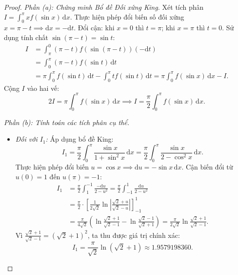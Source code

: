 \documentclass{article}
\begin{document}
\begin{proof}
\emph{Phần (a): Chứng minh Bổ đề Đối xứng King.}
Xét tích phân $I = \int_0^\pi x f(\sin x)\,\mathrm{d}x$. Thực hiện phép đổi biến số đối xứng $x = \pi - t \implies \mathrm{d}x = -\mathrm{d}t$.
Đổi cận: khi $x = 0$ thì $t = \pi$; khi $x = \pi$ thì $t = 0$. Sử dụng tính chất $\sin(\pi - t) = \sin t$:
\begin{align}
    I &= \int_\pi^0 (\pi - t) f(\sin(\pi - t)) (-\mathrm{d}t) \nonumber \\
    &= \int_0^\pi (\pi - t) f(\sin t)\,\mathrm{d}t \nonumber \\
    &= \pi \int_0^\pi f(\sin t)\,\mathrm{d}t - \int_0^\pi t f(\sin t)\,\mathrm{d}t = \pi \int_0^\pi f(\sin x)\,\mathrm{d}x - I.
\end{align}
Cộng $I$ vào hai vế:
\begin{equation}
    2I = \pi \int_0^\pi f(\sin x)\,\mathrm{d}x \implies I = \frac{\pi}{2} \int_0^\pi f(\sin x)\,\mathrm{d}x.
\end{equation}

\emph{Phần (b): Tính toán các tích phân cụ thể.}
\begin{itemize}
    \item \emph{Đối với $I_1$:} Áp dụng bổ đề King:
    \begin{equation}
        I_1 = \frac{\pi}{2} \int_0^\pi \frac{\sin x}{1 + \sin^2 x}\,\mathrm{d}x = \frac{\pi}{2} \int_0^\pi \frac{\sin x}{2 - \cos^2 x}\,\mathrm{d}x.
    \end{equation}
    Thực hiện phép đổi biến $u = \cos x \implies \mathrm{d}u = -\sin x\,\mathrm{d}x$. Cận biến đổi từ $u(0) = 1$ đến $u(\pi) = -1$:
    \begin{align}
        I_1 &= \frac{\pi}{2} \int_1^{-1} \frac{-\mathrm{d}u}{2 - u^2} = \frac{\pi}{2} \int_{-1}^1 \frac{\mathrm{d}u}{2 - u^2} \nonumber \\
        &= \frac{\pi}{2} \cdot \left[ \frac{1}{2\sqrt{2}} \ln\left|\frac{\sqrt{2} + u}{\sqrt{2} - u}\right| \right]_{-1}^1 \nonumber \\
        &= \frac{\pi}{4\sqrt{2}} \left( \ln\frac{\sqrt{2} + 1}{\sqrt{2} - 1} - \ln\frac{\sqrt{2} - 1}{\sqrt{2} + 1} \right) = \frac{\pi}{2\sqrt{2}} \ln\frac{\sqrt{2} + 1}{\sqrt{2} - 1}.
    \end{align}
    Vì $\frac{\sqrt{2} + 1}{\sqrt{2} - 1} = (\sqrt{2} + 1)^2$, ta thu được giá trị chính xác:
    \begin{equation}
        I_1 = \frac{\pi}{\sqrt{2}} \ln(\sqrt{2} + 1) \approx 1.9579198360.
    \end{equation}


\end{itemize}
\end{proof}
\end{document}
